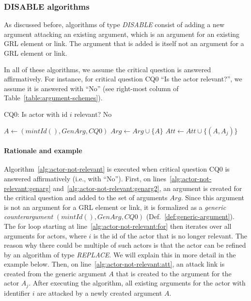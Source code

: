 \subsubsection{DISABLE algorithms}

As discussed before, algorithms of type \emph{DISABLE} consist of adding a new argument attacking an existing argument, which is an argument for an existing GRL element or link. The argument that is added is itself not an argument for a GRL element or link.

In all of these algorithms, we assume the critical question is answered affirmatively. For instance, for critical question CQ0 ``Is the actor relevant?'', we assume it is answered with ``No'' (see right-most column of Table~\ref{table:argument-schemes}).

\begin{algorithm}[h]
  \caption{CQ0: Is actor with id $i$ relevant? No}\label{alg:actor-not-relevant}
  \begin{algorithmic}[1]
    \State $A \leftarrow (mintId(),GenArg,CQ0)$\label{alg:actor-not-relevant:genarg}
    \State $Arg\leftarrow Arg \cup \{A\}$\label{alg:actor-not-relevant:genarg2}
    \label{alg:actor-not-relevant:for}
      \State $Att \leftarrow Att \cup \{(A,A_j)\}$\label{alg:actor-not-relevant:att}
    \EndFor
    \EndProcedure
  \end{algorithmic}
\end{algorithm}

\paragraph{Rationale and example} Algorithm~\ref{alg:actor-not-relevant} is executed when critical question CQ0 is answered affirmatively (i.e., with ``No''). First, on lines~\ref{alg:actor-not-relevant:genarg} and~\ref{alg:actor-not-relevant:genarg2}, an argument is created for the critical question and added to the set of arguments $Arg$. Since this argument is not an argument for a GRL element or link, it is formalized as a \emph{generic counterargument} $(mintId(), GenArg, CQ0)$ (Def.~\ref{def:generic-argument}). The for loop starting at line~\ref{alg:actor-not-relevant:for} then iterates over all arguments for actors, where $i$ is the id of the actor that is no longer relevant. The reason why there could be multiple of such actors is that the actor can be refined by an algorithm of type \emph{REPLACE}. We will explain this in more detail in the example below. Then, on line~\ref{alg:actor-not-relevant:att}, an attack link is created from the generic argument $A$ that is created to the argument for the actor $A_j$. After executing the algorithm, all existing arguments for the actor with identifier $i$ are attacked by a newly created argument $A$.

